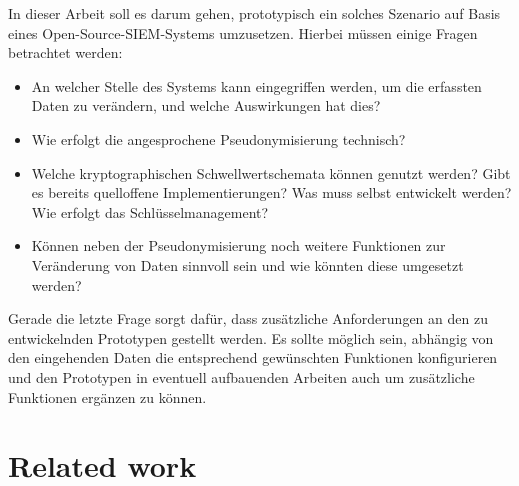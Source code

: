 


In dieser Arbeit soll es darum gehen, prototypisch ein solches Szenario auf Basis eines Open-Source-SIEM-Systems umzusetzen. 
Hierbei müssen einige Fragen betrachtet werden:

\begin{itemize}
\item An welcher Stelle des Systems kann eingegriffen werden, um die erfassten Daten zu verändern, und welche Auswirkungen hat dies?
\item Wie erfolgt die angesprochene Pseudonymisierung technisch?
\item Welche kryptographischen Schwellwertschemata können genutzt werden? Gibt es bereits quelloffene Implementierungen? Was muss selbst entwickelt werden? Wie erfolgt das Schlüsselmanagement?
\item Können neben der Pseudonymisierung noch weitere Funktionen zur Veränderung von Daten sinnvoll sein und wie könnten diese umgesetzt werden?
\end{itemize}

Gerade die letzte Frage sorgt dafür, dass zusätzliche Anforderungen an den zu entwickelnden Prototypen gestellt werden. Es sollte möglich sein, abhängig von den eingehenden Daten die entsprechend gewünschten Funktionen konfigurieren und den Prototypen in eventuell aufbauenden Arbeiten auch um zusätzliche Funktionen ergänzen zu können.



\section{Related work}
\label{related_work}


